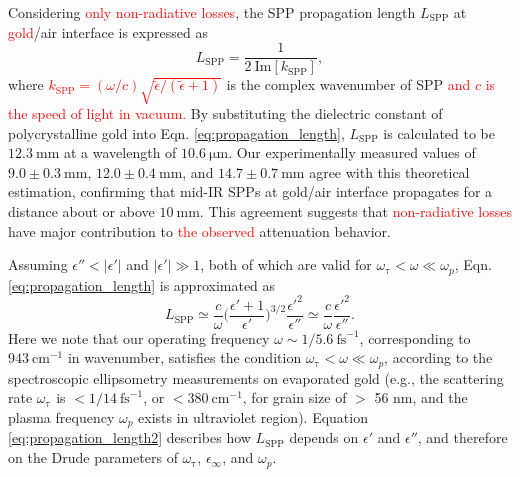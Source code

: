 \documentclass[aip,apl,reprint]{revtex4-1}
\begin{document}
\color{black}
Considering \textcolor{red}{only non-radiative losses}, the SPP propagation length $L_{\mathrm{SPP}}$ at \textcolor{red}{gold}/air interface is expressed as
\begin{equation}
 L_{\mathrm{SPP}} = \frac{1}{2\:\mathrm{Im}[k_{\mathrm{SPP}}]},
\label{eq:propagation_length}
\end{equation}
where \textcolor{red}{$k_{\mathrm{SPP}}=(\omega/c)\sqrt{\tilde{\epsilon}/(\tilde{\epsilon}+1)}$} is the complex wavenumber of SPP \textcolor{red}{and $c$ is the speed of light in vacuum.} By substituting the dielectric constant of polycrystalline gold\cite{Palik} into Eqn. \ref{eq:propagation_length}, $L_{\mathrm{SPP}}$ is calculated to be $12.3\:\mathrm{mm}$ at a wavelength of $10.6\:\mathrm{\mu m}$.
Our experimentally measured values of $9.0\pm0.3\:\mathrm{mm}$, $12.0\pm0.4\:\mathrm{mm}$, and $14.7\pm0.7\:\mathrm{mm}$ agree with this theoretical estimation, confirming that mid-IR SPPs at gold/air interface propagates for a distance about or above $10\:\mathrm{mm}$. This agreement suggests that \textcolor{red}{non-radiative losses} have major contribution to \textcolor{red}{the observed} attenuation behavior.

\color{red}
Assuming $\epsilon'' < |\epsilon'|$ and $|\epsilon'| \gg 1$, both of which are valid for $\omega_{\mathrm{\tau}} < \omega \ll \omega_p$, Eqn. \ref{eq:propagation_length} is approximated as\cite{Raether}
\begin{equation}
L_{\mathrm{SPP}} \simeq \frac{c}{\omega} \biggl(\frac{\epsilon'+1}{\epsilon'}\biggr)^{3/2} \frac{\epsilon'^2}{\epsilon''} \simeq \frac{c}{\omega} \frac{\epsilon'^2}{\epsilon''}.
\label{eq:propagation_length2}
\end{equation}
Here we note that our operating frequency $\omega \sim 1/5.6 ~\mathrm{fs}^{-1}$, corresponding to $943 ~\mathrm{cm}^{-1}$ in wavenumber, satisfies the condition $\omega_{\mathrm{\tau}} < \omega \ll \omega_p$, according to the spectroscopic ellipsometry measurements on evaporated gold \cite{Olmon, Trollmann}  (e.g., the scattering rate $\omega_{\mathrm{\tau}}$ is $<1/14\:\mathrm{fs}^{-1}$, or  $<380\:\mathrm{cm}^{-1}$, for grain size of $>$ 56 nm\cite{Trollmann}, and the plasma frequency $\omega_p$ exists in ultraviolet region). Equation \ref{eq:propagation_length2} describes how $L_{\mathrm{SPP}}$ depends on $\epsilon'$ and $\epsilon''$, and therefore on the Drude parameters of $\omega_{\mathrm{\tau}}$, $\epsilon_{\infty}$, and $\omega_p$.
\end{document}
